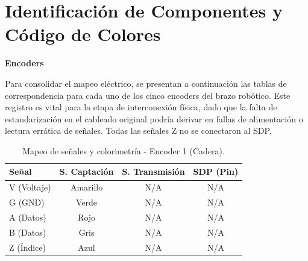 	
	
	\clearpage
	
	
	\section{Identificación de Componentes y Código de Colores}
	\textbf{Encoders}
	
	Para consolidar el mapeo eléctrico, se presentan a continuación las tablas de correspondencia para cada uno de los cinco encoders del brazo robótico. Este registro es vital para la etapa de interconexión física, dado que la falta de estandarización en el cableado original podría derivar en fallas de alimentación o lectura errática de señales. Todas las señales Z no se conectaron al SDP. 
	
	
	\begin{table}[h]
		\centering
		\caption{Mapeo de señales y colorimetría - Encoder 1 (Cadera).}
		\label{tab:encoder_cadera}
		\renewcommand{\arraystretch}{1.5}
		\begin{tabular}{lccc}
			\toprule
			\textbf{Señal} & \textbf{S. Captación} & \textbf{S. Transmisión} & \textbf{SDP (Pin)} \\ \midrule
			V (Voltaje)    & Amarillo              & N/A                     & N/A                \\
			G (GND)        & Verde                 & N/A                     & N/A                \\
			A (Datos)      & Rojo                  & N/A                     & N/A                \\
			B (Datos)      & Gris                  & N/A                     & N/A                \\
			Z (Índice)     & Azul                  & N/A                     & N/A                \\ \bottomrule
		\end{tabular}
	\end{table}
	
